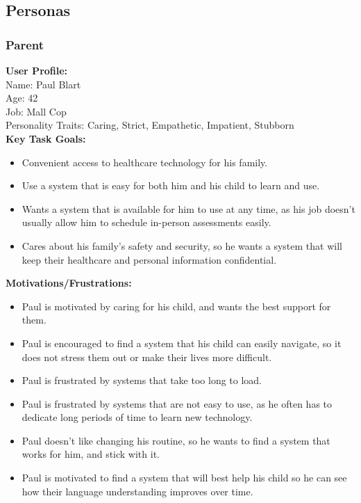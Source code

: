 \documentclass[12pt]{article}
\begin{document}
\subsection{Personas}

\subsubsection*{Parent}
\textbf{User Profile:}\\
Name: Paul Blart\\
Age: 42\\
Job: Mall Cop\\
Personality Traits: Caring, Strict, Empathetic, Impatient, Stubborn\\

\textbf{Key Task Goals:}
\begin{itemize}
  \item Convenient access to healthcare technology for his family.
  \item Use a system that is easy for both him and his child to learn and use.
  \item Wants a system that is available for him to use at any time, as his job doesn't usually allow him to schedule in-person assessments easily.
  \item Cares about his family's safety and security, so he wants a system that will keep their healthcare and personal information confidential.  
\end{itemize}

\textbf{Motivations/Frustrations:}
\begin{itemize}
  \item Paul is motivated by caring for his child, and wants the best support for them.
  \item Paul is encouraged to find a system that his child can easily navigate, so it does not stress them out or make their lives more difficult.
  \item Paul is frustrated by systems that take too long to load.
  \item Paul is frustrated by systems that are not easy to use, as he often has to dedicate long periods of time to learn new technology.
  \item Paul doesn't like changing his routine, so he wants to find a system that works for him, and stick with it.
  \item Paul is motivated to find a system that will best help his child so he can see how their language understanding improves over time.
\end{itemize}
\end{document}

